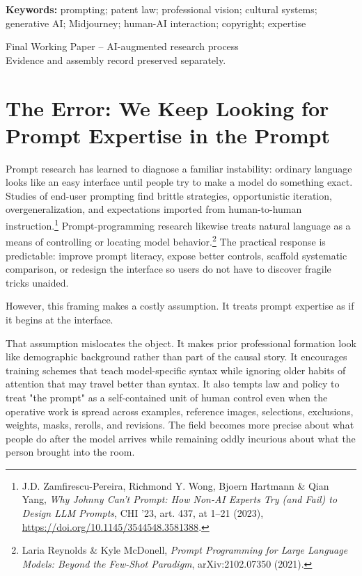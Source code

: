 \documentclass[11pt]{article}
\begin{document}
\begin{titlepage}
\vspace{0.8em}
\textbf{Keywords:} prompting; patent law; professional vision; cultural systems; generative AI; Midjourney; human-AI interaction; copyright; expertise

\vfill
\begin{flushright}
{\scriptsize Final Working Paper -- AI-augmented research process\\Evidence and assembly record preserved separately.}
\end{flushright}
\end{titlepage}

\section{The Error: We Keep Looking for Prompt Expertise in the Prompt}

Prompt research has learned to diagnose a familiar instability: ordinary language looks like an easy interface until people try to make a model do something exact. Studies of end-user prompting find brittle strategies, opportunistic iteration, overgeneralization, and expectations imported from human-to-human instruction.\footnote{J.D. Zamfirescu-Pereira, Richmond Y. Wong, Bjoern Hartmann \& Qian Yang, \textit{Why Johnny Can't Prompt: How Non-AI Experts Try (and Fail) to Design LLM Prompts}, CHI '23, art. 437, at 1--21 (2023), \url{https://doi.org/10.1145/3544548.3581388}.} Prompt-programming research likewise treats natural language as a means of controlling or locating model behavior.\footnote{Laria Reynolds \& Kyle McDonell, \textit{Prompt Programming for Large Language Models: Beyond the Few-Shot Paradigm}, arXiv:2102.07350 (2021).} The practical response is predictable: improve prompt literacy, expose better controls, scaffold systematic comparison, or redesign the interface so users do not have to discover fragile tricks unaided.

However, this framing makes a costly assumption. It treats prompt expertise as if it begins at the interface.

That assumption mislocates the object. It makes prior professional formation look like demographic background rather than part of the causal story. It encourages training schemes that teach model-specific syntax while ignoring older habits of attention that may travel better than syntax. It also tempts law and policy to treat "the prompt" as a self-contained unit of human control even when the operative work is spread across examples, reference images, selections, exclusions, weights, masks, rerolls, and revisions. The field becomes more precise about what people do after the model arrives while remaining oddly incurious about what the person brought into the room.
\end{document}
